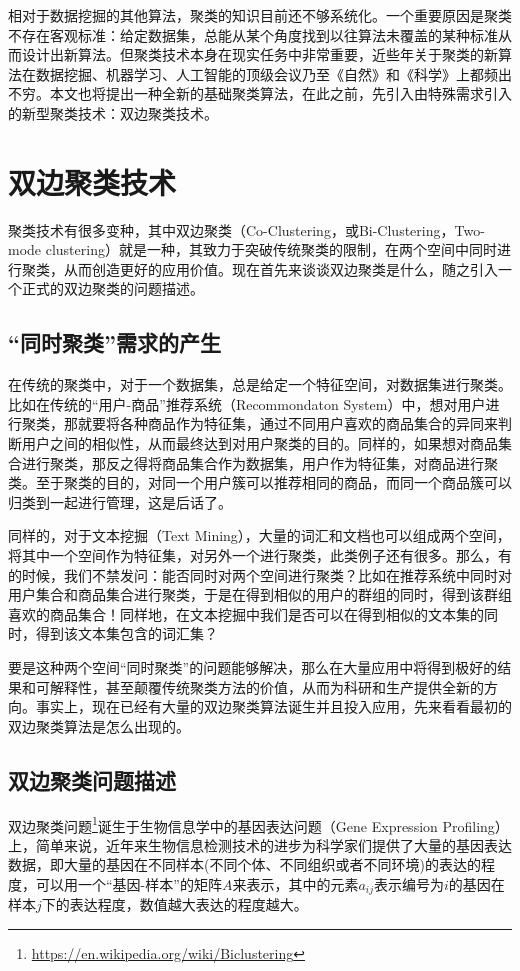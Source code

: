 \vspace{2mm}
相对于数据挖掘的其他算法，聚类的知识目前还不够系统化。一个重要原因是聚类不存在客观标准：给定数据集，总能从某个角度找到以往算法未覆盖的某种标准从而设计出新算法。但聚类技术本身在现实任务中非常重要，近些年关于聚类的新算法在数据挖掘、机器学习、人工智能的顶级会议乃至《自然》和《科学》上都频出不穷。本文也将提出一种全新的基础聚类算法，在此之前，先引入由特殊需求引入的新型聚类技术：双边聚类技术。



\section{双边聚类技术}
聚类技术有很多变种，其中双边聚类（Co-Clustering，或Bi-Clustering，Two-mode clustering）就是一种，其致力于突破传统聚类的限制，在两个空间中同时进行聚类，从而创造更好的应用价值。现在首先来谈谈双边聚类是什么，随之引入一个正式的双边聚类的问题描述。

\subsection{“同时聚类”需求的产生}
在传统的聚类中，对于一个数据集，总是给定一个特征空间，对数据集进行聚类。比如在传统的“用户-商品”推荐系统（Recommondaton System）中，想对用户进行聚类，那就要将各种商品作为特征集，通过不同用户喜欢的商品集合的异同来判断用户之间的相似性，从而最终达到对用户聚类的目的。同样的，如果想对商品集合进行聚类，那反之得将商品集合作为数据集，用户作为特征集，对商品进行聚类。至于聚类的目的，对同一个用户簇可以推荐相同的商品，而同一个商品簇可以归类到一起进行管理，这是后话了。

同样的，对于文本挖掘（Text Mining），大量的词汇和文档也可以组成两个空间，将其中一个空间作为特征集，对另外一个进行聚类，此类例子还有很多。那么，有的时候，我们不禁发问：能否同时对两个空间进行聚类？比如在推荐系统中同时对用户集合和商品集合进行聚类，于是在得到相似的用户的群组的同时，得到该群组喜欢的商品集合！同样地，在文本挖掘中我们是否可以在得到相似的文本集的同时，得到该文本集包含的词汇集？

要是这种两个空间“同时聚类”的问题能够解决，那么在大量应用中将得到极好的结果和可解释性，甚至颠覆传统聚类方法的价值，从而为科研和生产提供全新的方向。事实上，现在已经有大量的双边聚类算法诞生并且投入应用，先来看看最初的双边聚类算法是怎么出现的。

\subsection{双边聚类问题描述}
双边聚类问题\footnote{\url{https://en.wikipedia.org/wiki/Biclustering}}诞生于生物信息学中的基因表达问题（Gene Expression Profiling）上，简单来说，近年来生物信息检测技术的进步为科学家们提供了大量的基因表达数据，即大量的基因在不同样本(不同个体、不同组织或者不同环境)的表达的程度，可以用一个“基因-样本”的矩阵$A$来表示，其中的元素$a_{ij}$表示编号为$i$的基因在样本$j$下的表达程度，数值越大表达的程度越大。

